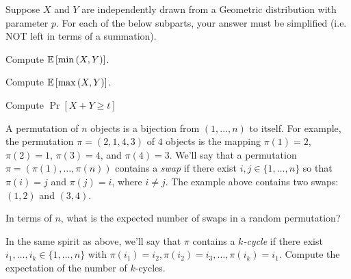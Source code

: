 \documentclass[11pt]{article}
\begin{document}
Suppose $X$ and $Y$ are independently drawn from a Geometric distribution with parameter $p$. For each of the below subparts, your answer must be simplified (i.e. NOT left in terms of a summation).

\begin{Parts}
    \Part Compute $\operatorname{\mathbb{E}}\left[\min\left(X,Y\right)\right]$.

    

    \Part Compute $\operatorname{\mathbb{E}}\left[\max\left(X,Y\right)\right]$.

    

    \Part Compute $\Pr[X + Y \ge t]$

    

\end{Parts}

A permutation of $n$ objects is a bijection from $(1,\ldots,n)$ to itself.  For example, the permutation $\pi=(2,1,4,3)$ of $4$ objects is the mapping $\pi(1) = 2$, $\pi(2) = 1$, $\pi(3) = 4$, and $\pi(4) = 3$.
We'll say that a permutation $\pi = (\pi(1),\ldots,\pi(n))$ contains a \emph{swap} if there exist $i,j\in\{1,\ldots,n\}$ so that $\pi(i) = j$ and $\pi(j) = i$, where $i \neq j$. The example above contains two swaps: $(1,2)$ and $(3,4)$.
\begin{Parts}
	\Part In terms of $n$, what is the expected number of swaps in a random permutation?
	
	\Part In the same spirit as above, we'll say that $\pi$ contains a \emph{$k$-cycle} if there exist $i_1,\ldots,i_k \in \{1,\ldots,n\}$ with $\pi(i_1) = i_2,\pi(i_2) = i_3,\ldots,\pi(i_k) = i_1$. Compute the expectation of the number of $k$-cycles. 
	
\end{Parts}
\end{document}
